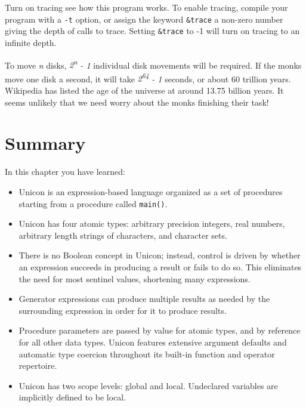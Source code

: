 \noindent
Turn on tracing see how this program works.
To enable tracing, compile your program with a
\texttt{{}-t} option, or assign the keyword \texttt{\&trace} a non-zero
number giving the depth of calls to trace. Setting \texttt{\&trace} to
-1 will turn on tracing to an infinite depth.

To move \textit{n} disks,
\textit{2}\textit{\textsuperscript{n}}\textit{ - 1} individual disk
movements will be required. If the monks move one disk a second, it
will take \textit{2}\textit{\textsuperscript{64}}\textit{ - 1}
seconds, or about 60 trillion years. Wikipedia has listed the age of
the universe at around 13.75 billion years. It seems unlikely
that we need worry about the monks finishing their task!

\section*{Summary}

In this chapter you have learned:

\begin{itemize}\itemsep0pt
\item Unicon is an expression-based language organized as a set of
procedures starting from a procedure called \texttt{main()}.

\item Unicon has four atomic types: arbitrary precision integers, real
numbers, arbitrary length strings of characters, and character sets.

\item There is no Boolean concept in Unicon; instead, control is driven
by whether an expression succeeds in producing a result or
fails to do so. This eliminates the need for most
sentinel values, shortening many expressions.

\item {}Generator expressions can produce multiple
results as needed by the surrounding expression in order for it to
produce results.

\item Procedure parameters are passed by value for atomic types, and by
reference for all other data types. Unicon features extensive argument
defaults and automatic type coercion throughout its built-in function
and operator repertoire.

\item Unicon has two scope levels: global and local. Undeclared
variables are implicitly defined to be local.
\end{itemize}

\bigskip
